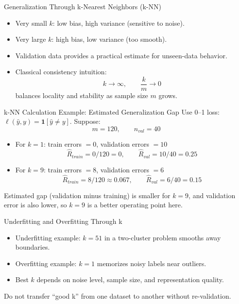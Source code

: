 \begin{frame}{Generalization Through k-Nearest Neighbors (k-NN)}
\begin{itemize}
  \item Very small $k$: low bias, high variance (sensitive to noise).
  \pause
  \item Very large $k$: high bias, low variance (too smooth).
  \pause
  \item Validation data provides a practical estimate for unseen-data behavior.
  \pause
  \item Classical consistency intuition:
  \[
  k \to \infty,\qquad \frac{k}{m}\to 0
  \]
  balances locality and stability as sample size \(m\) grows.
\end{itemize}
\end{frame}

\begin{frame}{k-NN Calculation Example: Estimated Generalization Gap}
\small
Use 0--1 loss: \(\ell(\hat{y},y)=\mathbf{1}[\hat{y}\neq y]\). Suppose:
\[
m=120,\qquad n_{val}=40
\]
\pause
\begin{itemize}
  \item For \(k=1\): train errors \(=0\), validation errors \(=10\)
  \[
  \hat{R}_{train}=0/120=0,\qquad \hat{R}_{val}=10/40=0.25
  \]
  \pause
  \item For \(k=9\): train errors \(=8\), validation errors \(=6\)
  \[
  \hat{R}_{train}=8/120\approx0.067,\qquad \hat{R}_{val}=6/40=0.15
  \]
\end{itemize}

\pause
\begin{rlintuition}
Estimated gap (validation minus training) is smaller for \(k=9\), and validation error is also lower, so \(k=9\) is a better operating point here.
\end{rlintuition}
\end{frame}

\begin{frame}{Underfitting and Overfitting Through k}
\begin{itemize}
  \item Underfitting example: $k=51$ in a two-cluster problem smooths away boundaries.
  \pause
  \item Overfitting example: $k=1$ memorizes noisy labels near outliers.
  \pause
  \item Best $k$ depends on noise level, sample size, and representation quality.
\end{itemize}

\pause
\begin{rlpitfall}
Do not transfer ``good k'' from one dataset to another without re-validation.
\end{rlpitfall}
\end{frame}

